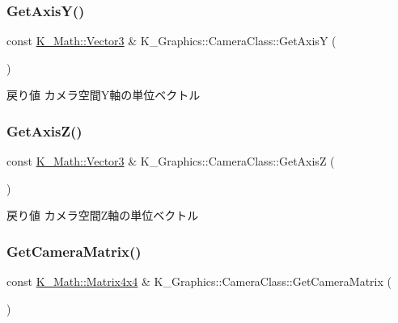\subsubsection{\texorpdfstring{Get\+Axis\+Y()}{GetAxisY()}}
{\footnotesize\ttfamily const \mbox{\hyperlink{namespace_k___math_a66884d78082c39ada4091c211f3570f8}{K\+\_\+\+Math\+::\+Vector3}} \& K\+\_\+\+Graphics\+::\+Camera\+Class\+::\+Get\+AxisY (\begin{DoxyParamCaption}{ }\end{DoxyParamCaption})}

\begin{DoxyReturn}{戻り値}
カメラ空間\+Y軸の単位ベクトル 
\end{DoxyReturn}
\mbox{\label{class_k___graphics_1_1_camera_class_af7a6866617e0e004b95a6dd33c4396b1}} 
\subsubsection{\texorpdfstring{Get\+Axis\+Z()}{GetAxisZ()}}
{\footnotesize\ttfamily const \mbox{\hyperlink{namespace_k___math_a66884d78082c39ada4091c211f3570f8}{K\+\_\+\+Math\+::\+Vector3}} \& K\+\_\+\+Graphics\+::\+Camera\+Class\+::\+Get\+AxisZ (\begin{DoxyParamCaption}{ }\end{DoxyParamCaption})}

\begin{DoxyReturn}{戻り値}
カメラ空間\+Z軸の単位ベクトル 
\end{DoxyReturn}
\mbox{\label{class_k___graphics_1_1_camera_class_a8e972464a146b6f87198debd8571d4e9}} 
\subsubsection{\texorpdfstring{Get\+Camera\+Matrix()}{GetCameraMatrix()}}
{\footnotesize\ttfamily const \mbox{\hyperlink{namespace_k___math_a345271af9d32dff2c964bc679b13b45c}{K\+\_\+\+Math\+::\+Matrix4x4}} \& K\+\_\+\+Graphics\+::\+Camera\+Class\+::\+Get\+Camera\+Matrix (\begin{DoxyParamCaption}{ }\end{DoxyParamCaption})}



